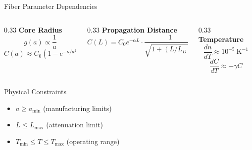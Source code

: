 \documentclass[10pt]{beamer}
\begin{document}
\begin{frame}{Fiber Parameter Dependencies}
\begin{columns}
\begin{column}{0.33\textwidth}
\textbf{Core Radius}
\begin{equation*}
g(a) \propto \frac{1}{a}
\end{equation*}
\begin{equation*}
C(a) \approx C_0 \left(1 - e^{-\kappa/a^2}\right)
\end{equation*}
\end{column}

\begin{column}{0.33\textwidth}
\textbf{Propagation Distance}
\begin{equation*}
C(L) = C_0 e^{-\alpha L} \cdot \frac{1}{\sqrt{1 + (L/L_D)^2}}
\end{equation*}
\end{column}

\begin{column}{0.33\textwidth}
\textbf{Temperature}
\begin{equation*}
\frac{dn}{dT} \approx 10^{-5} \ \text{K}^{-1}
\end{equation*}
\begin{equation*}
\frac{dC}{dT} \approx -\gamma C
\end{equation*}
\end{column}
\end{columns}

\begin{block}{Physical Constraints}
\begin{itemize}
\item $a \geq a_{\text{min}}$ (manufacturing limits)
\item $L \leq L_{\text{max}}$ (attenuation limit)
\item $T_{\text{min}} \leq T \leq T_{\text{max}}$ (operating range)
\end{itemize}
\end{block}
\end{frame}
\end{document}
